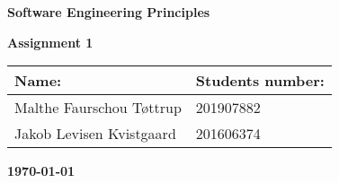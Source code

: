 \thispagestyle{empty}
\centerline{\fontsize{60}{70}\selectfont\textbf{Software Engineering Principles}}
\vspace{10mm}
\vspace{40mm}
\centerline{\Huge\textbf{Assignment 1}}
\vspace{40mm}

\begin{table}[htb]
\fontsize{16}{30}\selectfont
\centering
\begin{tabular}{| p{85mm} | p{60 mm} |}
\hline
\textbf{Name:}                      &  \textbf{Students number:}     \\ \hline
Malthe Faurschou Tøttrup            &  201907882                     \\ \hline
Jakob Levisen Kvistgaard            &  201606374                     \\ \hline
\end{tabular}
\end{table}

\vspace{10mm}
\vspace{20mm}

\centerline{\large\textbf{\today}}
\centerline{\large\textbf{ }}

